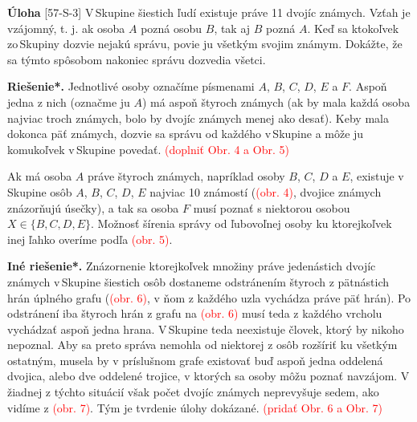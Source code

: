 \documentclass{article}
\newcommand{\rieh}{\textbf{Riešenie*.} }
\newcommand\todo[1]{\noindent\textcolor{red}{(#1)}}
\newcommand{\problem}[4]{
  \begin{tcolorbox}[breakable,notitle,boxrule=0pt,colback=light-gray,colframe=light-gray]
    \textbf{Úloha}
    [#1] #3
  \end{tcolorbox}
  \noindent#4
}
\begin{document}
\problem{57-S-3}{}{
V\,Skupine šiestich ľudí existuje práve 11 dvojíc známych. Vzťah \uv{poznať sa} je vzájomný, t. j. ak osoba $A$ pozná osobu $B$, tak aj $B$ pozná $A$. Keď sa ktokoľvek zo\,Skupiny dozvie nejakú správu, povie ju všetkým svojim známym. Dokážte, že sa týmto spôsobom nakoniec správu dozvedia všetci.
}{
\rieh Jednotlivé osoby označíme písmenami $A$, $B$, $C$, $D$, $E$ a $F$. Aspoň jedna
z nich (označme ju $A$) má aspoň štyroch známych (ak by mala každá osoba najviac
troch známych, bolo by dvojíc známych menej ako desať). Keby mala dokonca päť známych, dozvie sa správu od každého v\,Skupine a môže ju komukoľvek v\,Skupine povedať.
\todo{doplniť Obr. 4  a Obr. 5}

Ak má osoba $A$ práve štyroch známych, napríklad osoby $B$, $C$, $D$ a $E$, existuje
v\,Skupine osôb $A$, $B$, $C$, $D$, $E$ najviac 10 známostí (\todo{obr. 4}, dvojice známych znázorňujú úsečky), a tak sa osoba $F$ musí poznať s niektorou osobou $X \in \{B, C, D, E\}$. Možnosť
šírenia správy od ľubovoľnej osoby ku ktorejkoľvek inej ľahko overíme podľa \todo{obr. 5}.

\textbf{Iné riešenie*.} Znázornenie ktorejkoľvek množiny práve jedenástich dvojíc známych
v\,Skupine šiestich osôb dostaneme odstránením štyroch z pätnástich hrán úplného grafu
(\todo{obr. 6}, v ňom z každého uzla vychádza práve päť hrán). Po odstránení iba štyroch hrán
z grafu na \todo{obr. 6} musí teda z každého vrcholu vychádzať aspoň jedna hrana. V\,Skupine
teda neexistuje človek, ktorý by nikoho nepoznal. Aby sa preto správa nemohla od
niektorej z osôb rozšíriť ku všetkým ostatným, musela by v príslušnom grafe existovať
buď aspoň jedna oddelená dvojica, alebo dve oddelené trojice, v ktorých sa osoby môžu
poznať navzájom. V žiadnej z týchto situácií však počet dvojíc známych neprevyšuje
sedem, ako vidíme z \todo{obr. 7}. Tým je tvrdenie úlohy dokázané.
\todo{pridať  Obr. 6 a  Obr. 7}
}
\end{document}
